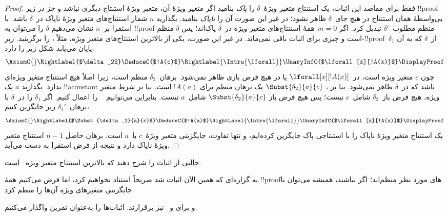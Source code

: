\documentclass[../../../include/open-logic-section]{subfiles}
\begin{document}
\begin{proof}
فقط برای مقاصد این اثبات، یک استنتاج متغیر ویژهٔ~$\delta$ را
\emph{پاک} بنامید اگر متغیر ویژهٔ آن، متغیر ویژهٔ استنتاج دیگری نباشد
و جز در زیر-!!{proof} بی‌واسطهٔ همان استنتاج در هیچ جای~$\delta$ ظاهر
نشود؛ در غیر این صورت آن را \emph{ناپاک} بنامید. بگذارید $n$ شمار
استنتاج‌های متغیر ویژهٔ ناپاک در~$\delta$ باشد. با استقرا بر~$n$ نشان
می‌دهیم $\delta$ را می‌توان به !!{proof} منظم مطلوب~$\delta'$ تبدیل
کرد. اگر $n=0$، همهٔ استنتاج‌های متغیر ویژه در~$\delta$ پاک‌اند؛ پس
$\delta$ منظم است و چیزی برای اثبات باقی نمی‌ماند. در غیر این صورت،
یکی از بالاترین استنتاج‌های متغیر ویژه، مثلاً \Intro{\lforall}، را
برگزینید. زیر-!!{proof}~$\delta_1$ از~$\delta$ که به آن پایان می‌یابد
شکل زیر را دارد:
    \[
    \AxiomC{}
    \RightLabel{$\delta_2$}
    \DeduceC{$!A(c)$}
    \RightLabel{\Intro{\lforall}}
    \UnaryInfC{$\lforall[x][!A(x)]$}
    \DisplayProof
    \]
چون $c$ متغیر ویژه است، در~$\lforall[x][!A(x)]$ یا در هیچ فرض بازی
ظاهر نمی‌شود. برهان~$\delta_2$ منظم است، زیرا اصلاً هیچ استنتاج متغیر
ویژه‌ای ندارد. بگذارید $a$ یک !!a{constant} باشد که در~$\delta$ ظاهر
نمی‌شود. بنا بر ،
$\Subst{\delta_2}{a}{c}$ یک برهان منظم برای $!A(a)$ است. بنا بر شرط
متغیر ویژه، هیچ فرض باز~$\delta_2$ شامل~$c$ نیست؛ پس هیچ فرض باز
$\Subst{\delta_2}{a}{c}$ شامل~$a$ نیست. بنابراین می‌توانیم
~\Intro{\lforall} را اعمال کنیم. اگر $\delta_1$ را در~$\delta$ با
برهان~$\delta_1'$ زیر جایگزین کنیم،
    \[
    \AxiomC{}
    \RightLabel{$\Subst{\delta_2}{a}{c}$}
    \DeduceC{$!A(a)$}
    \RightLabel{\Intro{\lforall}}
    \UnaryInfC{$\lforall[x][!A(x)]$}
    \DisplayProof
    \]
یک استنتاج متغیر ویژهٔ ناپاک را با استنتاجی پاک جایگزین کرده‌ایم، و
تنها تفاوت، جایگزینی متغیر ویژهٔ~$c$ با~$a$ است. برهان حاصل $n-1$
استنتاج متغیر ویژهٔ ناپاک دارد و نتیجه از فرض استقرا به دست می‌آید.
\end{proof}

\begin{prob}
حالتی از اثبات  را شرح دهید که بالاترین استنتاج
متغیر ویژه~\Elim{\lexists} است.
\end{prob}

به گزاره‌ای که همین الآن اثبات شد صریحاً استناد نخواهیم کرد، اما فرض
می‌کنیم همهٔ !!{proof}های مورد نظر منظم‌اند؛ اگر نباشند، همیشه می‌توان
با جایگزینی متغیرهای ویژه آن‌ها را منظم کرد.

 و  برای
 و~ نیز برقرارند. اثبات‌ها را به‌عنوان تمرین
واگذار می‌کنیم.
\end{document}
